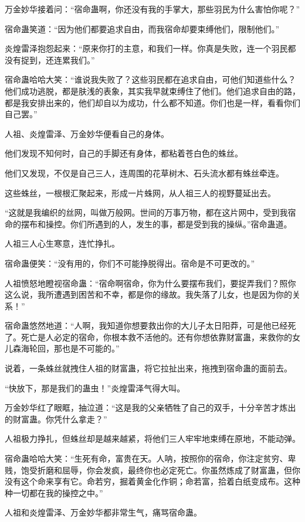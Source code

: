 \begin{this_body}
万金妙华接着问：“宿命蛊啊，你还没有我的手掌大，那些羽民为什么害怕你呢？”

宿命蛊笑道：“因为他们都要追求自由，而我宿命却要束缚他们，限制他们。”

炎煌雷泽抱怨起来：“原来你打的主意，和我们一样。你真是失败，连一个羽民都没有捉到，还连累我们。”

宿命蛊哈哈大笑：“谁说我失败了？这些羽民都在追求自由，可他们知道些什么？他们成功逃脱，都是肤浅的表象，其实我早就束缚住了他们。他们追求自由的路，都是我安排出来的，他们却自以为成功，什么都不知道。你们也是一样，看看你们自己罢。”

人祖、炎煌雷泽、万金妙华便看自己的身体。

他们发现不知何时，自己的手脚还有身体，都粘着苍白色的蛛丝。

他们又发现，不仅是自己三人，连周围的花草树木、石头流水都有蛛丝牵连。

这些蛛丝，一根根汇聚起来，形成一片蛛网，从人祖三人的视野蔓延出去。

“这就是我编织的丝网，叫做万般网。世间的万事万物，都在这片网中，受到我宿命的摆布和操控。你们所遇到的人，发生的事，都是受到我的操纵。”宿命蛊道。

人祖三人心生寒意，连忙挣扎。

宿命蛊便笑：“没有用的，你们不可能挣脱得出。宿命是不可更改的。”

人祖愤怒地瞪视宿命蛊：“宿命啊宿命，你为什么要摆布我们，要捉弄我们？照你这么说，我所遭遇到困苦和不幸，都是你的缘故。我失落了儿女，也是因为你的关系！”

宿命蛊悠然地道：“人啊，我知道你想要救出你的大儿子太日阳莽，可是他已经死了。死亡是人必定的宿命，你根本救不活他的。还有你想依靠财富蛊，来救你的女儿森海轮回，那也是不可能的。”

说着，一条蛛丝就拽住人祖的财富蛊，将它拉扯出来，拖拽到宿命蛊的面前去。

“快放下，那是我们的蛊虫！”炎煌雷泽气得大叫。

万金妙华红了眼眶，抽泣道：“这是我的父亲牺牲了自己的双手，十分辛苦才炼出的财富蛊。你凭什么拿走？”

人祖极力挣扎，但蛛丝却是越来越紧，将他们三人牢牢地束缚在原地，不能动弹。

宿命蛊哈哈大笑：“生死有命，富贵在天。人呐，按照你的宿命，你注定贫穷、卑贱，饱受折磨和屈辱，你会发疯，最终你也必定死亡。你虽然炼成了财富蛊，但你没有这个命来享有它。命若穷，掘着黄金化作铜；命若富，拾着白纸变成布。这种种一切都在我的操控之中。”

人祖和炎煌雷泽、万金妙华都非常生气，痛骂宿命蛊。


\end{this_body}
